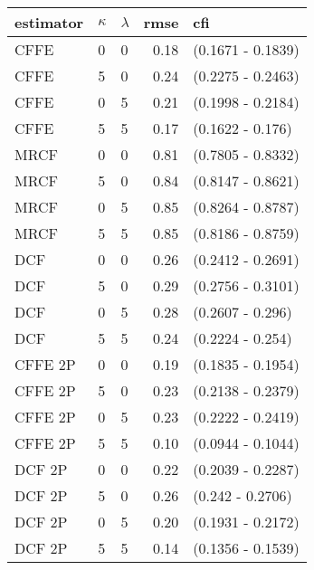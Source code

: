 \begin{tabular}{lllrl}
  \hline
estimator & $\kappa$ & $\lambda$ & rmse & cfi \\ 
  \hline
CFFE  & 0 & 0 & 0.18 & (0.1671 - 0.1839) \\ 
  CFFE  & 5 & 0 & 0.24 & (0.2275 - 0.2463) \\ 
  CFFE  & 0 & 5 & 0.21 & (0.1998 - 0.2184) \\ 
  CFFE  & 5 & 5 & 0.17 & (0.1622 - 0.176) \\ 
  MRCF  & 0 & 0 & 0.81 & (0.7805 - 0.8332) \\ 
  MRCF  & 5 & 0 & 0.84 & (0.8147 - 0.8621) \\ 
  MRCF  & 0 & 5 & 0.85 & (0.8264 - 0.8787) \\ 
  MRCF  & 5 & 5 & 0.85 & (0.8186 - 0.8759) \\ 
  DCF  & 0 & 0 & 0.26 & (0.2412 - 0.2691) \\ 
  DCF  & 5 & 0 & 0.29 & (0.2756 - 0.3101) \\ 
  DCF  & 0 & 5 & 0.28 & (0.2607 - 0.296) \\ 
  DCF  & 5 & 5 & 0.24 & (0.2224 - 0.254) \\ 
  CFFE 2P  & 0 & 0 & 0.19 & (0.1835 - 0.1954) \\ 
  CFFE 2P  & 5 & 0 & 0.23 & (0.2138 - 0.2379) \\ 
  CFFE 2P  & 0 & 5 & 0.23 & (0.2222 - 0.2419) \\ 
  CFFE 2P  & 5 & 5 & 0.10 & (0.0944 - 0.1044) \\ 
  DCF 2P  & 0 & 0 & 0.22 & (0.2039 - 0.2287) \\ 
  DCF 2P  & 5 & 0 & 0.26 & (0.242 - 0.2706) \\ 
  DCF 2P  & 0 & 5 & 0.20 & (0.1931 - 0.2172) \\ 
  DCF 2P  & 5 & 5 & 0.14 & (0.1356 - 0.1539) \\ 
   \hline
\end{tabular}
